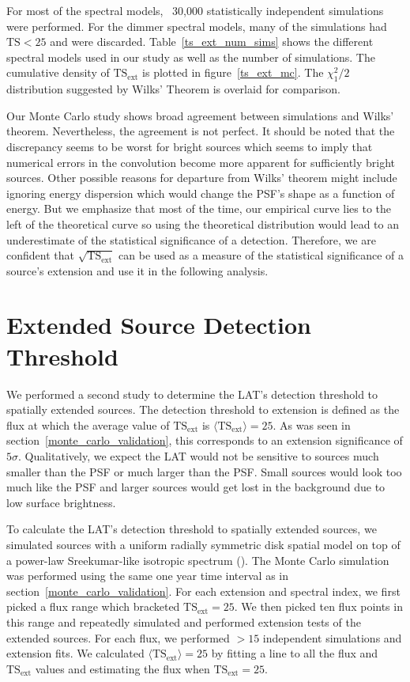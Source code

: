 \documentclass[12pt,preprint]{aastex}
\newcommand{\tsext}{{\ensuremath{\text{TS}_\text{ext}}}\xspace}
\newcommand{\ts}{\text{TS}\xspace}
\newcommand{\pointlike}{\text{\em pointlike}\xspace}
\begin{document}
For most of the spectral models, ~30,000 statistically independent
simulations were performed. For the dimmer spectral models, many of the
simulations had $\ts<25$ and were discarded.  Table~\ref{ts_ext_num_sims}
shows the different spectral models used in our study as well as the
number of simulations.  The cumulative density of \tsext is plotted in
figure~\ref{ts_ext_mc}. The $\chi^2_1/2$ distribution suggested by Wilks'
Theorem is overlaid for comparison.

Our Monte Carlo study shows broad agreement between simulations and Wilks'
theorem. Nevertheless, the agreement is not perfect.  It should be noted
that the discrepancy seems to be worst for bright sources which seems to
imply that numerical errors in the convolution become more apparent for
sufficiently bright sources.  Other possible reasons for departure from
Wilks' theorem might include \pointlike ignoring energy dispersion which
would change the PSF's shape as a function of energy. But we emphasize
that most of the time, our empirical curve lies to the left of the
theoretical curve so using the theoretical distribution would lead to an
underestimate of the statistical significance of a detection. Therefore,
we are confident that $\sqrt{\tsext}$ can be used as a measure of the
statistical significance of a source's extension and use it in the
following analysis.

\section{Extended Source Detection Threshold}\label{extension_sensitivity}

We performed a second study to determine the LAT's detection
threshold to spatially extended sources. The detection threshold
to extension is defined as the flux at which the average
value of $\tsext$ is $\langle\tsext\rangle=25$. As was seen in
section~\ref{monte_carlo_validation}, this corresponds to an extension
significance of $5\sigma$.  Qualitatively, we expect the LAT would not
be sensitive to sources much smaller than the PSF or much larger than
the PSF.  Small sources would look too much like the PSF and larger
sources would get lost in the background due to low surface brightness.

To calculate the LAT's detection threshold to spatially extended
sources, we simulated sources with a uniform radially symmetric disk
spatial model on top of a power-law Sreekumar-like isotropic spectrum
(\cite{sreekumar_isotropic}).  The Monte Carlo simulation was performed
using the same one year time interval as in section~\ref{monte_carlo_validation}.
For each extension and spectral index, we
first picked a flux range which bracketed $\tsext=25$. We then picked
ten flux points in this range and repeatedly simulated and performed
extension tests of the extended sources.  For each flux, we performed
$>15$ independent simulations and extension fits.  We calculated
$\langle\tsext\rangle=25$ by fitting a line to all the flux and
$\tsext$ values and estimating the flux when $\tsext=25$.
\end{document}
